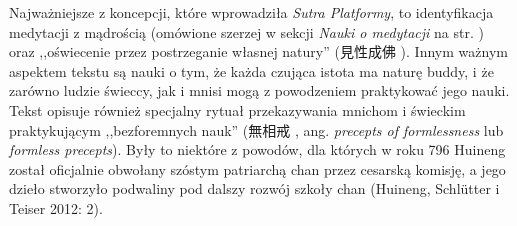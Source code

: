 Najważniejsze z koncepcji, które wprowadziła \textit{Sutra Platformy}, to identyfikacja medytacji z mądrością (omówione szerzej w sekcji \textit{Nauki o medytacji} na str. \pageref{DingHui}) oraz ,,oświecenie przez postrzeganie własnej natury'' (見性成佛 ).
Innym ważnym aspektem tekstu są nauki o tym, że każda czująca istota ma naturę buddy, i że zarówno ludzie świeccy, jak i mnisi mogą z powodzeniem praktykować jego nauki.
Tekst opisuje również specjalny rytuał przekazywania mnichom i świeckim praktykującym ,,bezforemnych nauk'' (無相戒 , ang. \textit{precepts of formlessness} lub \textit{formless precepts}). %
Były to niektóre z powodów, dla których w roku 796 Huineng został oficjalnie obwołany szóstym patriarchą chan przez cesarską komisję, a jego dzieło stworzyło podwaliny pod dalszy rozwój szkoły chan
(Huineng, Schlütter i Teiser 2012: 2).

